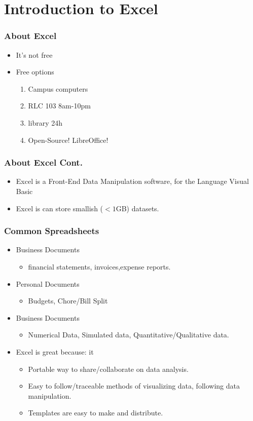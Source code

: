 \documentclass[17pt]{beamer}
\begin{document}
\section{Introduction to Excel}
\begin{frame}
	\frametitle{About Excel}
	\begin{itemize}
	\item It's not free
	\item Free options
	\begin{enumerate}
		\item Campus computers
		\item RLC 103 8am-10pm
		\item library 24h 
		\item Open-Source! LibreOffice! 
	\end{enumerate}
	\end{itemize}
\end{frame}
\begin{frame}
	\frametitle{About Excel Cont.}
	\begin{itemize}
		\item Excel is a Front-End Data Manipulation software, for the Language Visual Basic
		\item Excel is can store smallish ($<1$GB) datasets.
	\end{itemize}	
\end{frame}
\begin{frame}
	\frametitle{Common Spreadsheets}
	\begin{itemize}
		\item Business Documents
		\begin{itemize}
			\item financial statements, invoices,expense reports.		
		\end{itemize}
		\item Personal Documents
			\begin{itemize}
				\item Budgets, Chore/Bill Split		
			\end{itemize}
		\item Business Documents
			\begin{itemize}
				\item Numerical Data, Simulated data, Quantitative/Qualitative data.   
			\end{itemize}
	\item Excel is great because: it 
	\begin{itemize}
		\item Portable way to share/collaborate on data analysis.
		\item Easy to follow/traceable methods of visualizing data, following data manipulation.
		\item Templates are easy to make and distribute. 
	\end{itemize}
	\end{itemize}
\end{frame}
\end{document}
